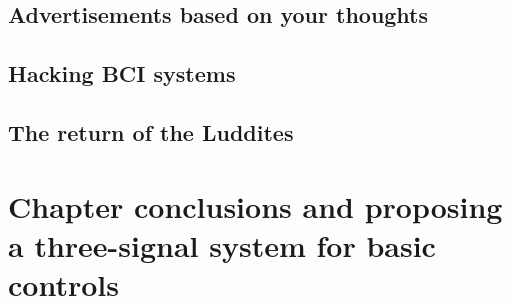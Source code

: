 

\subsection{Advertisements based on your thoughts}
\label{subsec:bci_ethical_data_mining}

\lipsum[1]


\subsection{Hacking BCI systems}
\label{subsec:bci_ethical_hacking}

\lipsum[1]



\subsection{The return of the Luddites}
\label{subsec:bci_ethical_luddites}

\lipsum[1]


\section{Chapter conclusions and proposing a three-signal system for basic controls}
\label{sec:bci_concolusion_and_proposing_ours}



